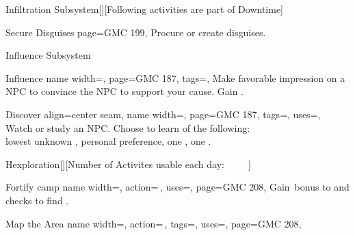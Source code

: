 \begin{PageFront}
\begin{Tables}{\frontTableHeight}
\begin{Table}{Infiltration Subsystem}[\;\dash\;][Following activities are part of
        Downtime]
\begin{entry}{Secure Disguises}
{                page=GMC 199,
            }
                Procure or create disguises. \\\phant{}
            \end{entry}
        \end{Table}
        \vfill
        \begin{Table}{Influence Subsystem}
            \begin{entry}{Influence}{%
                name width=\activityLength,%
                page=GMC 187,
                tags=\Concentrate\Linguistic,
            }
                Make favorable impression on a NPC to convince the NPC to support your cause.
                \hfill Gain  .
            \end{entry}
            \begin{entry}{Discover}{%
                align=center seam,
                name width=\activityLength,%
                page=GMC 187,
                tags=\Concentrate,
                uses={\Perception[tags=S]},
            }
                Watch or study an NPC.
                Choose to learn  of the following:  \hfill{}\\
                {lowest unknown  , \quad personal preference, \quad one ,
                    \quad one .}
            \end{entry}
        \end{Table}
        \vfill
        \begin{Table}{Hexploration}[][Number of Activites usable each day:
        \quad\quad {}\,\Feet {}%
        \quad\quad {}\,\Feet {}%
        \quad\quad {}\,\Feet {}%
        \quad\quad {}\,\Feet {}%
        \quad\quad {}\,\Feet {}]
            \begin{entry}{Fortify camp}{%
                name width=\activityLength,%
                action=\,,
                uses=\Crafting,
                page=GMC 208,
            }
                Gain \,\Cirm bonus to  and  checks to find .
            \end{entry}
            \begin{entry}{Map the Area}{%
                name width=\activityLength,%
                action=\,,
                tags=\Concentrate,
                uses=\Survival,
                page=GMC 208,
            }

\end{entry}
\end{Table}
\end{Tables}
\end{PageFront}
